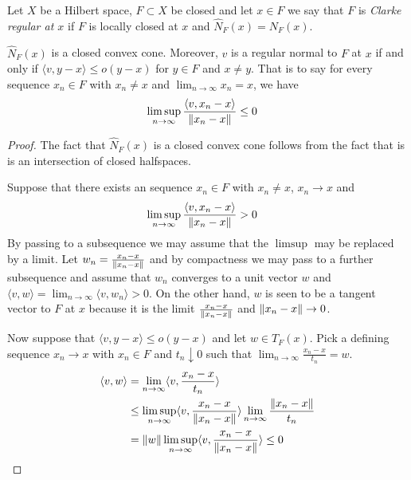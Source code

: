 \begin{defn}Let $X$ be a Hilbert space, $F \subset X$ be closed and let
  $x \in F$ we say that $F$ is \emph{Clarke regular at $x$} if $F$ is locally closed at $x$ and
$\widehat{N}_F(x) = N_F(x)$.
\end{defn}

\begin{prop}\label{RegularNormalLittleO}$\widehat{N}_F(x)$ is a closed convex cone.  Moreover, $v$ is a regular normal to $F$ at $x$ if and only if
  $\langle v, y-x \rangle \leq o(y -x)$ for $y \in F$ and $x \neq y$.  That is to say
  for every sequence $x_n \in F$ with $x_n \neq x$ and $\lim_{n \to \infty} x_n = x$, we have 
\begin{align*}
\limsup_{n \to \infty} \frac{\langle v, x_n-x \rangle}{\left \lVert x_n - x \right \rVert}
&\leq 0
\end{align*}
\end{prop}
\begin{proof}
The fact that $\widehat{N}_F(x)$ is a closed convex cone follows from
the fact that is is an intersection of closed halfspaces.

Suppose that there exists an sequence $x_n \in F$ with $x_n \neq x$,
$x_n \to x$ and 
\begin{align*}
\limsup_{n \to \infty} \frac{\langle v, x_n-x \rangle}{\left \lVert x_n - x \right \rVert}
&> 0
\end{align*}
By passing to a subsequence we may assume that the $\limsup$ may be
replaced by a limit.  Let $w_n = \frac{x_n - x}{\left \lVert x_n - x \right \rVert}$ and
  by compactness we may pass to a further
subsequence and assume that $w_n$ converges
  to a unit vector $w$ and $\langle v,w \rangle = \lim_{n \to \infty} \langle v,w_n \rangle > 0$. 
On the other hand, $w$ is seen to be a tangent vector to $F$ at $x$ because it is
the limit $\frac{x_n - x}{\left \lVert x_n - x \right \rVert}$ and $\left \lVert x_n -x \right \rVert \to 0$.

Now suppose that $\langle v, y-x \rangle \leq o(y -x)$ and let $w \in T_F(x)$.  Pick a defining
sequence $x_n \to x$ with $x_n \in F$ and $t_n \downarrow 0$ such that $\lim_{n \to \infty} \frac{x_n - x}{t_n} = w$.
\begin{align*}
\langle v,w \rangle &= \lim_{n \to \infty} \langle v, \frac{x_n - x}{t_n} \rangle \\
&\leq \limsup_{n \to \infty} \langle v, \frac{x_n - x}{\left \lVert x_n- x \right \rVert} \rangle \lim_{n \to \infty} \frac{\left \lVert x_n - x \right \rVert}{t_n} \\
&= \left \lVert w \right \rVert \limsup_{n \to \infty} \langle v, \frac{x_n - x}{\left \lVert x_n- x \right \rVert} \rangle \leq 0\\
\end{align*}
\end{proof}


